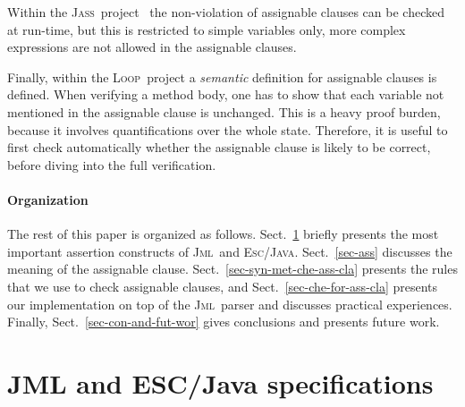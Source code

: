 \documentclass[a4paper]{llncs}
\newcommand{\jml}{\textsc{Jml}}
\newcommand{\escj}{\textsc{Esc/Java}}
\newcommand{\jass}{\textsc{Jass}}
\newcommand{\loopp}{\textsc{Loop}}
\newcommand{\java}{\textsc{Java}}
\newcommand{\csrc}{\textsc{Compaq Src}}
\begin{document}
Within the \jass\ project~\cite{JassUrl} the non-violation of assignable
clauses can be checked at run-time, but this is restricted to simple
variables only, more complex expressions are not allowed in the
assignable clauses.

Finally, within the \loopp\ project a \emph{semantic} definition for
assignable clauses is defined. When verifying a method body, one has
to show that each variable not mentioned in the assignable clause is
unchanged. This is a heavy proof burden, because it involves
quantifications over the whole state. Therefore, it is useful to first
check automatically whether the assignable clause is likely to be
correct, before diving into the full verification.

\paragraph{\bf{Organization}}

The rest of this paper is organized as follows.
Sect.~\ref{sec-esc-prg} briefly presents the most important
assertion constructs of \jml\ and \escj. Sect.~\ref{sec-ass}
discusses the meaning of the assignable clause.
Sect.~\ref{sec-syn-met-che-ass-cla} presents the rules that we use
to check assignable clauses, and Sect.~\ref{sec-che-for-ass-cla}
presents our implementation on top of the \jml\ parser and discusses
practical experiences.  Finally, Sect.~\ref{sec-con-and-fut-wor}
gives conclusions and presents future work.






\section{JML and ESC/Java specifications}
\label{sec-esc-prg}
\end{document}
